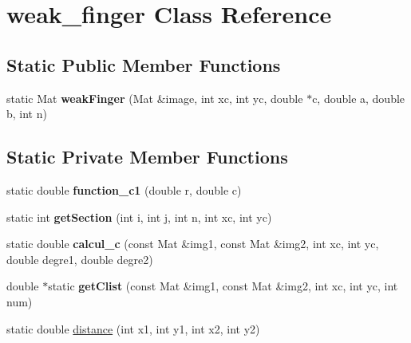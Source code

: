 \hypertarget{classweak__finger}{}\section{weak\+\_\+finger Class Reference}
\label{classweak__finger}
\subsection*{Static Public Member Functions}
\begin{DoxyCompactItemize}
\item 
static Mat {\bfseries weak\+Finger} (Mat \&image, int xc, int yc, double $\ast$c, double a, double b, int n)\hypertarget{classweak__finger_aae78642bcd3c521265eb169a6c303ceb}{}\label{classweak__finger_aae78642bcd3c521265eb169a6c303ceb}

\end{DoxyCompactItemize}
\subsection*{Static Private Member Functions}
\begin{DoxyCompactItemize}
\item 
static double {\bfseries function\+\_\+c1} (double r, double c)\hypertarget{classweak__finger_a5d28dfff1eb846e58c6fb9a3d8339aca}{}\label{classweak__finger_a5d28dfff1eb846e58c6fb9a3d8339aca}

\item 
static int {\bfseries get\+Section} (int i, int j, int n, int xc, int yc)\hypertarget{classweak__finger_a66c72e34708d6e37f63c004b78141eaa}{}\label{classweak__finger_a66c72e34708d6e37f63c004b78141eaa}

\item 
static double {\bfseries calcul\+\_\+c} (const Mat \&img1, const Mat \&img2, int xc, int yc, double degre1, double degre2)\hypertarget{classweak__finger_ac616774a6f7f4171904ffe30702c505a}{}\label{classweak__finger_ac616774a6f7f4171904ffe30702c505a}

\item 
double $\ast$static {\bfseries get\+Clist} (const Mat \&img1, const Mat \&img2, int xc, int yc, int num)\hypertarget{classweak__finger_a27f9293f3d1882a03a477296a65d16a4}{}\label{classweak__finger_a27f9293f3d1882a03a477296a65d16a4}

\item 
static double \hyperlink{classweak__finger_ae121304f5306a04b1e0a40f3a678785c}{distance} (int x1, int y1, int x2, int y2)
\end{DoxyCompactItemize}


